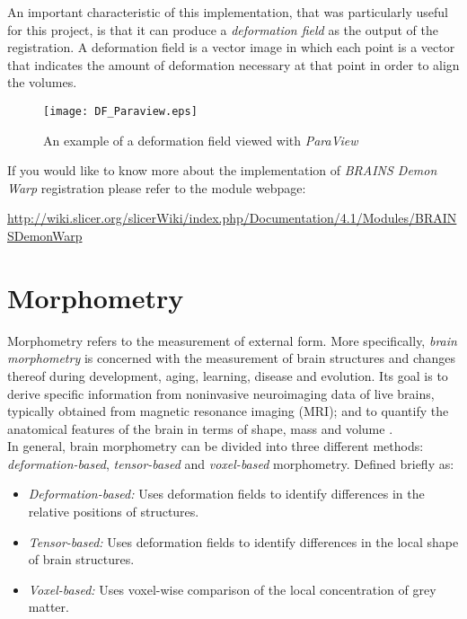 An important characteristic of this implementation, that was
particularly useful for this project, is that it can produce a
\textit{deformation field} as the output of the registration. A
deformation field is a vector image in which each point is a vector
that indicates the amount of deformation necessary
at that point in order to align the volumes.\\

\begin{figure}[H]
  \centering
  \texttt{[image: DF\_Paraview.eps]}
  \caption{An example of a deformation field viewed with \textit{ParaView}}
  \label{voxel_ex_5}
\end{figure}


If you would like to know more about the implementation of
\textit{BRAINS Demon Warp} registration please refer to the module
webpage:

\url{http://wiki.slicer.org/slicerWiki/index.php/Documentation/4.1/Modules/BRAINSDemonWarp}


\section{Morphometry}
Morphometry refers to the measurement of external form. More
specifically, \textit{brain morphometry} is concerned with the
measurement of brain structures and changes thereof during
development, aging, learning, disease and evolution. Its goal is to
derive specific information from noninvasive neuroimaging data of live
brains, typically obtained from magnetic resonance imaging (MRI); and
to quantify the anatomical features of the brain in terms of shape,
mass and volume \cite{brmorph}.\\

In general, brain morphometry can be divided into three different methods: \textit{deformation-based}, \textit{tensor-based} and \textit{voxel-based} morphometry. Defined briefly as:
\begin{itemize}
\item \textit{Deformation-based:} Uses deformation fields to identify differences in the relative positions of structures.
\item \textit{Tensor-based:} Uses deformation fields to identify differences in the local shape of brain structures.
\item \textit{Voxel-based:} Uses voxel-wise comparison of the local concentration of grey matter.
\end{itemize}


